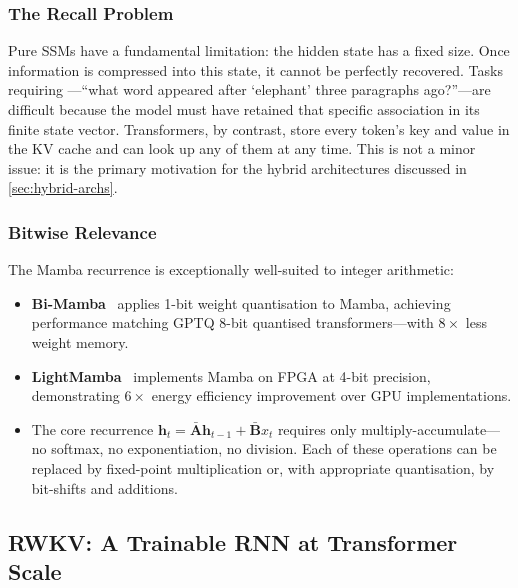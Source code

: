 \subsubsection{The Recall Problem}

\begin{engineernote}
Pure SSMs have a fundamental limitation: the hidden state has a fixed
size. Once information is compressed into this state, it cannot be
perfectly recovered. Tasks requiring ---``what
word appeared after `elephant' three paragraphs ago?''---are difficult
because the model must have retained that specific association in its
finite state vector. Transformers, by contrast, store every token's
key and value in the KV cache and can look up any of them at any
time. This is not a minor issue: it is the primary motivation for the
hybrid architectures discussed in \cref{sec:hybrid-archs}.
\end{engineernote}

\subsubsection{Bitwise Relevance}

The Mamba recurrence is exceptionally well-suited to
integer arithmetic:

\begin{itemize}[leftmargin=2em]
  \item \textbf{Bi-Mamba}~\cite{ma2024bimamba} applies 1-bit
    weight quantisation to Mamba, achieving performance matching
    GPTQ 8-bit quantised transformers---with $8\times$ less weight
    memory.
  \item \textbf{LightMamba}~\cite{lightmamba2025} implements Mamba
    on FPGA at 4-bit precision, demonstrating $6\times$ energy
    efficiency improvement over GPU implementations.
  \item The core recurrence $\mathbf{h}_t = \bar{\mathbf{A}}
    \mathbf{h}_{t-1} + \bar{\mathbf{B}} x_t$ requires only
    multiply-accumulate---no softmax, no exponentiation, no
    division. Each of these operations can be replaced by
    fixed-point multiplication or, with appropriate quantisation,
    by bit-shifts and additions.
\end{itemize}

\subsection{RWKV: A Trainable RNN at Transformer Scale}
\label{sec:rwkv}

